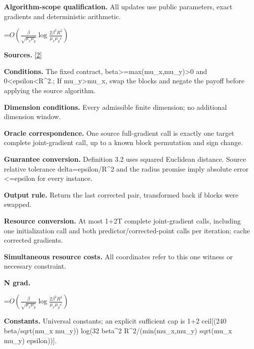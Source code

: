 \documentclass[10pt,a4paper]{article}
\newcommand{\AtlasMath}[1]{\par\begingroup\centering\setbox0=\hbox{$\displaystyle #1$}\ifdim\wd0>1.4\linewidth\typeout{ATLAS WIDE FORMULA: \the\wd0}\fi\ifdim\wd0>\linewidth\resizebox{\linewidth}{!}{\box0}\else\box0\fi\par\endgroup}
\begin{document}
\textbf{Algorithm-scope qualification.} All updates use public parameters, exact gradients and deterministic arithmetic.



\AtlasMath{O\!\left(\frac{\beta}{\sqrt{\mu_x\mu_y}}\log\frac{2\beta^2R^2}{\mu_x\mu_y\varepsilon}\right)}


\textbf{Sources.} \href{https://arxiv.org/pdf/2609.20327v2}{[2]}



\textbf{Conditions.} The fixed contract, beta>=max(mu\_x,mu\_y)>0 and 0<epsilon<R\textasciicircum{}2.; If mu\_y>mu\_x, swap the blocks and negate the payoff before applying the source algorithm.



\textbf{Dimension conditions.} Every admissible finite dimension; no additional dimension window.



\textbf{Oracle correspondence.} One source full-gradient call is exactly one target complete joint-gradient call, up to a known block permutation and sign change.



\textbf{Guarantee conversion.} Definition 3.2 uses squared Euclidean distance. Source relative tolerance delta=epsilon/R\textasciicircum{}2 and the radius promise imply absolute error <=epsilon for every instance.



\textbf{Output rule.} Return the last corrected pair, transformed back if blocks were swapped.



\textbf{Resource conversion.} At most 1+2T complete joint-gradient calls, including one initialization call and both predictor/corrected-point calls per iteration; cache corrected gradients.



\textbf{Simultaneous resource costs.} All coordinates refer to this one witness or necessary constraint.



\textbf{N grad.}



\AtlasMath{O\!\left(\frac{\beta}{\sqrt{\mu_x\mu_y}}\log\frac{2\beta^2R^2}{\mu_x\mu_y\varepsilon}\right)}


\textbf{Constants.} Universal constants; an explicit sufficient cap is 1+2 ceil[(240 beta/sqrt(mu\_x mu\_y)) log(32 beta\textasciicircum{}2 R\textasciicircum{}2/(min(mu\_x,mu\_y) sqrt(mu\_x mu\_y) epsilon))].
\end{document}
